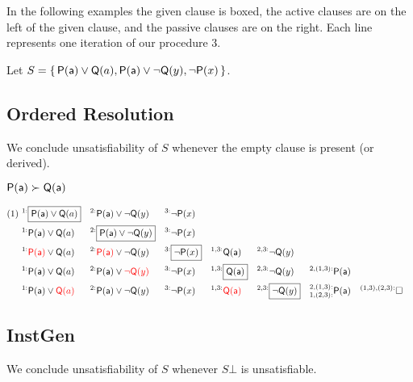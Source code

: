 In the following examples the given clause is boxed, 
the active clauses are on the left of the given clause, 
and the passive clauses are on the right. 
Each line represents one iteration of our procedure 3.

Let $S=\{\, {\mathsf P}({\mathsf a})\lor{\mathsf Q}(a), {\mathsf P}({\mathsf a})\lor\lnot{\mathsf Q}(y), \lnot{\mathsf P}(x) \,\}$.

\subsection{Ordered Resolution}

We conclude unsatisfiability of $S$ whenever the empty clause is present (or derived).

\begin{example} ${\mathsf P}({\mathsf a})\succ{\mathsf Q}({\mathsf a})$
	
	\begin{align*}
	(1)\ ^{1:}&\boxed{\mP(\ma)\lor\mQ(a)} & ^{2:}&\mP(\ma)\lor\lnot\mQ(y) & ^{3:}&\lnot\mP(x) 
	\\
	^{1:}&\mP(\ma)\lor\mQ(a) & ^{2:}&\boxed{\mP(\ma)\lor\lnot\mQ(y)} & ^{3:}&\lnot\mP(x) 
	\\
	^{1:}&{\colLo\mP(\ma)}\lor\mQ(a) & ^{2:}&{\colLo\mP(\ma)}\lor\lnot\mQ(y) & ^{3:}&\boxed{\lnot\mP(x)} 
	& ^{1,3:}&\mQ(\ma) & ^{2,3:}&\lnot\mQ(y)
	\\
	^{1:}&\mP(\ma)\lor\mQ(a) & ^{2:}&\mP(\ma)\lor{\colLo\lnot\mQ(y)} & ^{3:}&\lnot\mP(x)
	& ^{1,3:}&\boxed{\mQ(\ma)} & ^{2,3:}&\lnot\mQ(y) & ^{2,(1,3):}&\mP(\ma)
	\\
	^{1:}&\mP(\ma)\lor{\colLo\mQ(a)} & ^{2:}&\mP(\ma)\lor\lnot\mQ(y) & ^{3:}&\lnot\mP(x)
	& ^{1,3:}&\colLo\mQ(\ma) & ^{2,3:}&\boxed{\lnot\mQ(y)} & ^{2,(1,3):}_{1,(2,3):}&\mP(\ma)
	& ^{(1,3),(2,3):}&\emptyclause
	\\
	\end{align*}
\end{example}

\subsection{InstGen}

We conclude unsatisfiability of $S$ whenever $S\bot$ is unsatisfiable. 


